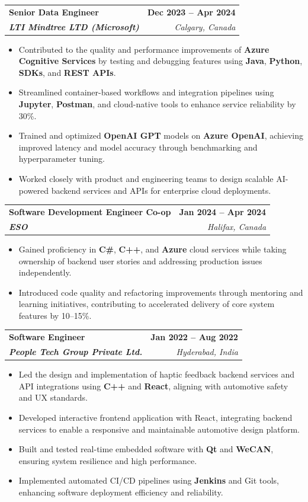 \documentclass[letterpaper,11pt]{article}
\makeatletter
\newcommand{\resumeItem}[1]{
  \item\small{
    {#1 \vspace{-2pt}}
  }
}
\newcommand{\resumeSubheading}[4]{
  \vspace{-2pt}\item
    \begin{tabular*}{1.0\textwidth}[t]{l@{\extracolsep{\fill}}r}
      \textbf{#1} & \textbf{\small #2} \\
      \textit{\small#3} & \textit{\small #4} \\
    \end{tabular*}\vspace{-7pt}
}
\newcommand{\resumeItemListStart}{\begin{itemize}}
\newcommand{\resumeItemListEnd}{\end{itemize}\vspace{-5pt}}
\makeatother
\begin{document}
    \resumeSubheading
      {\textbf{Senior Data Engineer}}{\textbf{Dec 2023 -- Apr 2024}}
      {\textbf{LTI Mindtree LTD (Microsoft)}}{Calgary, Canada}
      \resumeItemListStart
        \resumeItem{Contributed to the quality and performance improvements of \textbf{Azure Cognitive Services} by testing and debugging features using \textbf{Java}, \textbf{Python}, \textbf{SDKs}, and \textbf{REST APIs}.}
        \resumeItem{Streamlined container-based workflows and integration pipelines using \textbf{Jupyter}, \textbf{Postman}, and cloud-native tools to enhance service reliability by 30\%.}
        \resumeItem{Trained and optimized \textbf{OpenAI GPT} models on \textbf{Azure OpenAI}, achieving improved latency and model accuracy through benchmarking and hyperparameter tuning.}
        \resumeItem{Worked closely with product and engineering teams to design scalable AI-powered backend services and APIs for enterprise cloud deployments.}
      \resumeItemListEnd
    
    \resumeSubheading
      {\textbf{Software Development Engineer Co-op}}{\textbf{Jan 2024 -- Apr 2024}}
      {\textbf{ESO}}{Halifax, Canada}
      \resumeItemListStart
        \resumeItem{Gained proficiency in \textbf{C\#}, \textbf{C++}, and \textbf{Azure} cloud services while taking ownership of backend user stories and addressing production issues independently.}
        \resumeItem{Introduced code quality and refactoring improvements through mentoring and learning initiatives, contributing to accelerated delivery of core system features by 10--15\%.}
      \resumeItemListEnd

    \resumeSubheading
      {\textbf{Software Engineer}}{\textbf{Jan 2022 -- Aug 2022}}
      {\textbf{People Tech Group Private Ltd.}}{Hyderabad, India}
      \resumeItemListStart
        \resumeItem{Led the design and implementation of haptic feedback backend services and API integrations using \textbf{C++} and \textbf{React}, aligning with automotive safety and UX standards.}
        \resumeItem{Developed interactive frontend application with React, integrating backend services to enable a responsive and maintainable automotive design platform.}
        \resumeItem{Built and tested real-time embedded software with \textbf{Qt} and \textbf{WeCAN}, ensuring system resilience and high performance.}
        \resumeItem{Implemented automated CI/CD pipelines using \textbf{Jenkins} and Git tools, enhancing software deployment efficiency and reliability.}
      \resumeItemListEnd
\end{document}
